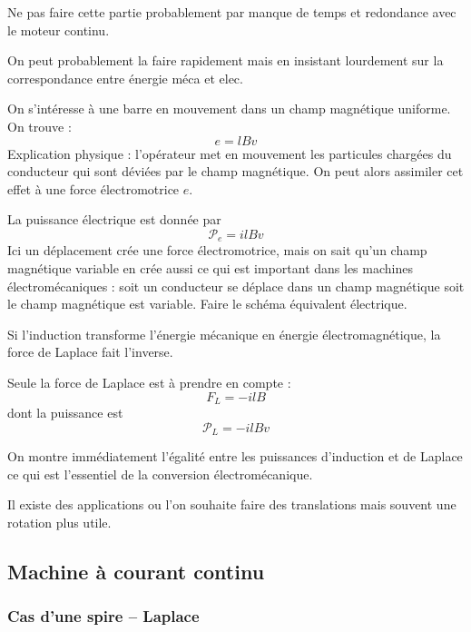 Ne pas faire cette partie probablement par manque de temps et redondance avec le moteur continu.

On peut probablement la faire rapidement mais en insistant lourdement sur la correspondance entre énergie méca et elec.

On s'intéresse à une barre en mouvement dans un champ magnétique uniforme.
On trouve :
\begin{equation}
e = lBv
\end{equation}
Explication physique : l'opérateur met en mouvement les particules chargées du conducteur qui sont déviées par le champ magnétique.
On peut alors assimiler cet effet à une force électromotrice $e$.

La puissance électrique est donnée par 
\begin{equation}
{\mathcal{P}}_e = ilBv
\end{equation}
Ici un déplacement crée une force électromotrice, mais on sait qu'un champ magnétique variable en crée aussi ce qui est important dans les machines électromécaniques : soit un conducteur se déplace dans un champ magnétique soit le champ magnétique est variable.
Faire le schéma équivalent électrique.

Si l'induction transforme l'énergie mécanique en énergie électromagnétique, la force de Laplace fait l'inverse.

Seule la force de Laplace est à prendre en compte :
\begin{equation}
F_L = -ilB
\end{equation}
dont la puissance est
\begin{equation}
{\mathcal{P}}_L = -ilBv
\end{equation}

On montre immédiatement l'égalité entre les puissances d'induction et de Laplace ce qui est l'essentiel de la conversion électromécanique.

\begin{transition}
Il existe des applications ou l'on souhaite faire des translations mais souvent une rotation plus utile.
\end{transition}

\subsection{Machine à courant continu}

\subsubsection{Cas d'une spire -- Laplace}

